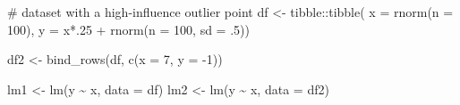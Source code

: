 \documentclass[
  letterpaper,
  DIV=11,
  numbers=noendperiod]{scrreport}
\newenvironment{Shaded}{\begin{snugshade}}{\end{snugshade}}
\newcommand{\AttributeTok}[1]{\textcolor[rgb]{0.40,0.45,0.13}{#1}}
\newcommand{\CommentTok}[1]{\textcolor[rgb]{0.37,0.37,0.37}{#1}}
\newcommand{\DecValTok}[1]{\textcolor[rgb]{0.68,0.00,0.00}{#1}}
\newcommand{\FunctionTok}[1]{\textcolor[rgb]{0.28,0.35,0.67}{#1}}
\newcommand{\NormalTok}[1]{\textcolor[rgb]{0.00,0.23,0.31}{#1}}
\newcommand{\OtherTok}[1]{\textcolor[rgb]{0.00,0.23,0.31}{#1}}
\newcommand{\SpecialCharTok}[1]{\textcolor[rgb]{0.37,0.37,0.37}{#1}}
\begin{document}
\begin{Shaded}
\begin{Highlighting}[]
\CommentTok{\# dataset with a high{-}influence outlier point }
\NormalTok{df }\OtherTok{\textless{}{-}}\NormalTok{ tibble}\SpecialCharTok{::}\FunctionTok{tibble}\NormalTok{(}
  \AttributeTok{x =} \FunctionTok{rnorm}\NormalTok{(}\AttributeTok{n =} \DecValTok{100}\NormalTok{),}
  \AttributeTok{y =}\NormalTok{ x}\SpecialCharTok{*}\NormalTok{.}\DecValTok{25} \SpecialCharTok{+} \FunctionTok{rnorm}\NormalTok{(}\AttributeTok{n =} \DecValTok{100}\NormalTok{, }\AttributeTok{sd =}\NormalTok{ .}\DecValTok{5}\NormalTok{))}

\NormalTok{df2 }\OtherTok{\textless{}{-}} \FunctionTok{bind\_rows}\NormalTok{(df, }\FunctionTok{c}\NormalTok{(}\AttributeTok{x =} \DecValTok{7}\NormalTok{, }\AttributeTok{y =} \SpecialCharTok{{-}}\DecValTok{1}\NormalTok{))}

\NormalTok{lm1 }\OtherTok{\textless{}{-}} \FunctionTok{lm}\NormalTok{(y }\SpecialCharTok{\textasciitilde{}}\NormalTok{ x, }\AttributeTok{data =}\NormalTok{ df)}
\NormalTok{lm2 }\OtherTok{\textless{}{-}} \FunctionTok{lm}\NormalTok{(y }\SpecialCharTok{\textasciitilde{}}\NormalTok{ x, }\AttributeTok{data =}\NormalTok{ df2)}


\end{Highlighting}
\end{Shaded}
\end{document}
